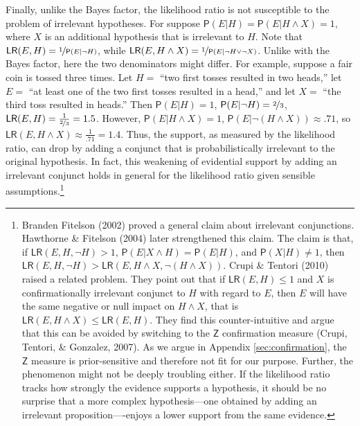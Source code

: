 \documentclass[
  10pt,
  dvipsnames,enabledeprecatedfontcommands]{scrartcl}
\newcommand{\n}{\neg}
\newcommand{\et}{\wedge}
\newcommand{\pr}[1]{\mathsf{P}(#1)}
\begin{document}
Finally, unlike the Bayes factor, the likelihood ratio is not
susceptible to the problem of irrelevant hypotheses. For suppose
\(\pr{E\vert H} = \pr{E\vert H \et X} = 1\), where \(X\) is an
additional hypothesis that is irrelevant to \(H\). Note that
\(\mathsf{LR}(E,H) = \nicefrac{1}{\pr{E \vert \n H}}\), while
\(\mathsf{LR}(E, H \et X) = \nicefrac{1}{\pr{E \vert \n H \vee \n X}}\).
Unlike with the Bayes factor, here the two denominators might differ.
For example, suppose a fair coin is tossed three times. Let \(H=\) ``two
first tosses resulted in two heads,'' let \(E=\) ``at least one of the
two first tosses resulted in a head,'' and let \(X=\) ``the third toss
resulted in heads.'' Then \(\pr{E \vert H} =1\),
\(\pr{E\vert \n H} = \nicefrac{2}{3}\),
\(\mathsf{LR}(E,H) = \frac{1}{\nicefrac{2}{3}} = 1.5\). However,
\(\pr{E\vert H \et X} =1\), \(\pr{E \vert \n (H \et X)} \approx .71\),
so \(\mathsf{LR}(E,H \et X) \approx \frac{1}{.71} = 1.4\). Thus, the
support, as measured by the likelihood ratio, can drop by adding a
conjunct that is probabilistically irrelevant to the original
hypothesis. In fact, this weakening of evidential support by adding an
irrelevant conjunct holds in general for the likelihood ratio given
sensible assumptions.\footnote{Branden Fitelson (2002) proved a general
  claim about irrelevant conjunctions. Hawthorne \& Fitelson (2004)
  later strengthened this claim. The claim is that, if
  \(\mathsf{LR}(E,H,\n H)>1\),
  \(\pr{E \vert X \et H} = \pr{E \vert H}\), and
  \(\pr{X \vert H} \neq 1\), then
  \(\mathsf{LR}(E,H,\n H) > \mathsf{LR}(E,H \et X,\n(H \et X))\). Crupi
  \& Tentori (2010) raised a related problem. They point out that if
  \(\mathsf{LR}(E,H)\leq 1\) and \(X\) is confirmationally irrelevant
  conjunct to \(H\) with regard to \(E\), then \(E\) will have the same
  negative or null impact on \(H \et X\), that is
  \(\mathsf{LR}(E,H \et X ) \leq \mathsf{LR}(E,H)\). They find this
  counter-intuitive and argue that this can be avoided by switching to
  the \(\mathsf{Z}\) confirmation measure (Crupi, Tentori, \& Gonzalez,
  2007). As we argue in Appendix \ref{sec:confirmation}, the
  \(\mathsf{Z}\) measure is prior-sensitive and therefore not fit for
  our purpose. Further, the phenomenon might not be deeply troubling
  either. If the likelihood ratio tracks how strongly the evidence
  supports a hypothesis, it should be no surprise that a more complex
  hypothesis---one obtained by adding an irrelevant
  proposition----enjoys a lower support from the same evidence.}

\vspace{1mm}
\footnotesize
\end{document}
